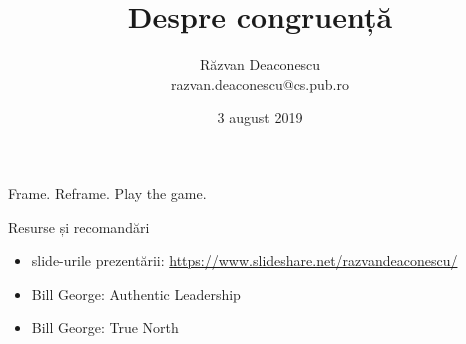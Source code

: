 \documentclass{simple}
\title[Despre congurență]{Despre congruență}
\institute{InfoEducație 2019, Gălăciuc, Vrancea}
\author[Răzvan Deaconescu]{Răzvan Deaconescu \\
razvan.deaconescu@cs.pub.ro}
\date{3 august 2019}
\begin{document}
\frame{\titlepage}

\begin{frame}{}
  \pause
  \centering
  \LARGE{Frame. Reframe. Play the game.}
\end{frame}

\begin{frame}{Resurse și recomandări}
  \begin{itemize}
    \item slide-urile prezentării: \url{https://www.slideshare.net/razvandeaconescu/}
    \item Bill George: Authentic Leadership
    \item Bill George: True North
  \end{itemize}
\end{frame}
\end{document}
